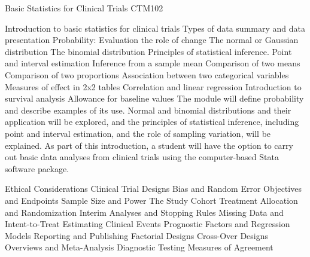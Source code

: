 Basic Statistics for Clinical Trials
CTM102

Introduction to basic statistics for clinical trials
Types of data summary and data presentation
Probability: Evaluation the role of change
The normal or Gaussian distribution
The binomial distribution
Principles of statistical inference.
Point and interval estimation
Inference from a sample mean
Comparison of two means
Comparison of two proportions
Association between two categorical variables
Measures of effect in 2x2 tables
Correlation and linear regression
Introduction to survival analysis
Allowance for baseline values
The module will define probability and describe examples of its use.
Normal and binomial distributions and their application will be explored, and the principles of statistical inference, including point and interval estimation, and the role of sampling variation, will be explained.
As part of this introduction, a student will have the option to carry out basic data analyses from clinical trials using the computer-based Stata software package.

Ethical Considerations
Clinical Trial Designs
Bias and Random Error
Objectives and Endpoints
Sample Size and Power
The Study Cohort
Treatment Allocation and Randomization
Interim Analyses and Stopping Rules
Missing Data and Intent-to-Treat
Estimating Clinical Events
Prognostic Factors and Regression Models
Reporting and Publishing
Factorial Designs
Cross-Over Designs
Overviews and Meta-Analysis
Diagnostic Testing
Measures of Agreement
